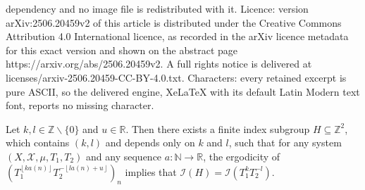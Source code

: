 \documentclass[10pt,a4paper]{amsart}
\newcommand{\CI}{{\mathcal I}}
\newcommand{\CX}{{\mathcal X}}
\newcommand{\R}{{\mathbb R}}
\newcommand{\floor}[1]{{\left \lfloor #1 \right \rfloor}}
\begin{document}
dependency and no image file is redistributed with it. Licence: version arXiv:2506.20459v2 of this article is distributed under the Creative Commons Attribution 4.0 International licence, as recorded in the arXiv licence metadata for this exact version and shown on the abstract page https://arxiv.org/abs/2506.20459v2. A full rights notice is delivered at licenses/arxiv-2506.20459-CC-BY-4.0.txt. Characters: every retained excerpt is pure ASCII, so the delivered engine, XeLaTeX with its default Latin Modern text font, reports no missing character.
\begin{proposition}\label{P: beta rational}
    Let $k,l\in\mathbb{Z}\backslash\{0\}$ and $u\in\R$. Then there exists a finite index subgroup $H\subseteq\mathbb{Z}^{2}$, which contains $(k,l)$ and depends only on $k$ and $l$, such that for any system $(X,\CX,\mu, T_{1},T_{2})$ and any sequence $a\colon\mathbb{N}\to\mathbb{R}$, the ergodicity of $(T_{1}^{\floor{ka(n)}}T_{2}^{-\floor{la(n)+u}})_{n}$ implies that $\CI(H)=\CI(T_{1}^{k}T_{2}^{-l})$.   
\end{proposition}
\end{document}
